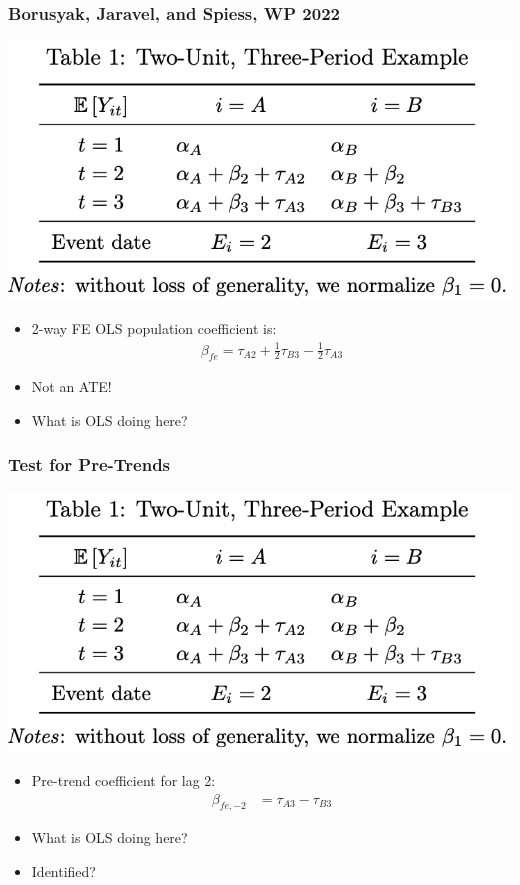 \documentclass[english,xcolor=svgnames]{beamer}
\begin{document}
\begin{frame}
\frametitle[alignment=center]{Borusyak, Jaravel, and Spiess, WP 2022}
\begin{center}
	\includegraphics[scale=0.5]{figures/BJSTAB1.png}
\end{center}
\begin{itemize}
	\item 2-way FE OLS population coefficient is:
	\begin{align*}
		\beta_{fe} = \tau_{A2} + \frac{1}{2}\tau_{B3} - \frac{1}{2}\tau_{A3}
	\end{align*}
	\item Not an ATE!
	\item What is OLS doing here?
\end{itemize}
\end{frame}


\begin{frame}
\frametitle[alignment=center]{Test for Pre-Trends}
\begin{center}
	\includegraphics[scale=0.5]{figures/BJSTAB1.png}
\end{center}
\begin{itemize}
	\item Pre-trend coefficient for lag 2:
	\begin{align*}
		\beta_{fe,-2} &= \tau_{A3} - \tau_{B3}
	\end{align*}
	\item What is OLS doing here?
	\item Identified?
\end{itemize}
\end{frame}
\end{document}
